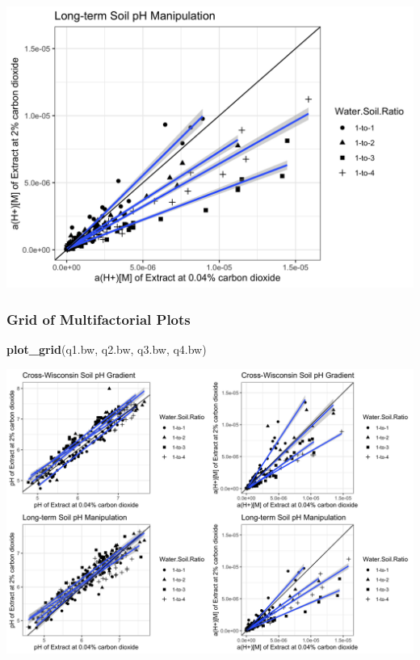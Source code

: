 \documentclass[]{article}
\newenvironment{Shaded}{\begin{snugshade}}{\end{snugshade}}
\newcommand{\KeywordTok}[1]{\textcolor[rgb]{0.13,0.29,0.53}{\textbf{#1}}}
\newcommand{\NormalTok}[1]{#1}
\begin{document}
\includegraphics{output-rmd/spooner-stand-sim-soil-hplus-bw-1.png}

\hypertarget{grid-of-multifactorial-plots-1}{%
\subsubsection{Grid of Multifactorial
Plots}\label{grid-of-multifactorial-plots-1}}

\begin{Shaded}
\begin{Highlighting}[]
\KeywordTok{plot_grid}\NormalTok{(q1.bw, q2.bw, q3.bw, q4.bw) }
\end{Highlighting}
\end{Shaded}

\includegraphics{output-rmd/multifactoral-grid-ph-bw-1.png}
\end{document}
